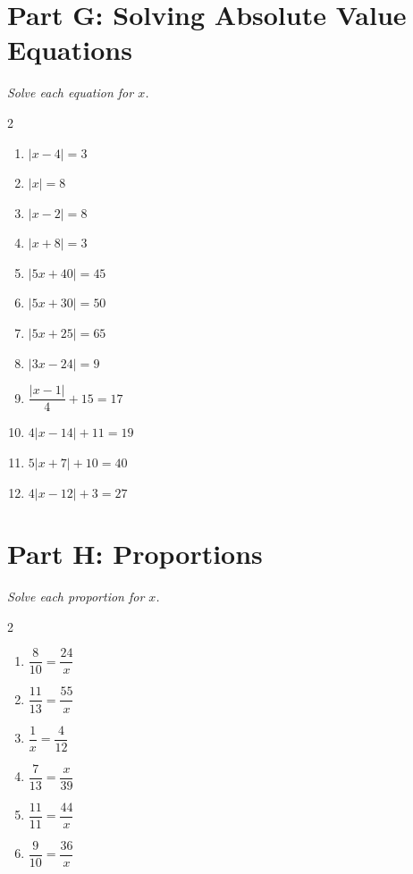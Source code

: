 \documentclass[11pt]{article}
\begin{document}
\section*{Part G: Solving Absolute Value Equations}
\noindent\textit{Solve each equation for $x$.}
\begin{multicols}{2}
\begin{enumerate}
  \item $|x - 4| = 3$
  \vspace{1.8cm}
  \item $|x| = 8$
  \vspace{1.8cm}
  \item $|x - 2| = 8$
  \vspace{1.8cm}
  \item $|x + 8| = 3$
  \vspace{1.8cm}
  \item $|5x + 40| = 45$
  \vspace{1.8cm}
  \item $|5x + 30| = 50$
  \vspace{1.8cm}
  \item $|5x + 25| = 65$
  \vspace{1.8cm}
  \item $|3x - 24| = 9$
  \vspace{1.8cm}
  \item $\dfrac{|x - 1|}{4} + 15 = 17$
  \vspace{1.8cm}
  \item $4|x - 14| + 11 = 19$
  \vspace{1.8cm}
  \item $5|x + 7| + 10 = 40$
  \vspace{1.8cm}
  \item $4|x - 12| + 3 = 27$
  \vspace{1.8cm}
\end{enumerate}
\end{multicols}

\section*{Part H: Proportions}
\noindent\textit{Solve each proportion for $x$.}
\begin{multicols}{2}
\begin{enumerate}
  \item $\dfrac{8}{10} = \dfrac{24}{x}$
  \vspace{1.5cm}
  \item $\dfrac{11}{13} = \dfrac{55}{x}$
  \vspace{1.5cm}
  \item $\dfrac{1}{x} = \dfrac{4}{12}$
  \vspace{1.5cm}
  \item $\dfrac{7}{13} = \dfrac{x}{39}$
  \vspace{1.5cm}
  \item $\dfrac{11}{11} = \dfrac{44}{x}$
  \vspace{1.5cm}
  \item $\dfrac{9}{10} = \dfrac{36}{x}$
  \vspace{1.5cm}
\end{enumerate}
\end{multicols}
\end{document}
